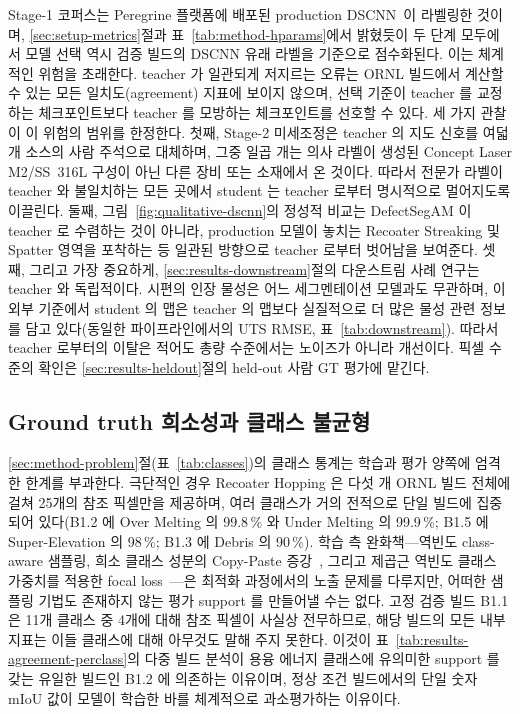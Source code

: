Stage-1 코퍼스는 Peregrine 플랫폼에 배포된 production
DSCNN~\cite{Scime2020DSCNN}이 라벨링한 것이며,
\ref{sec:setup-metrics}절과 표~\ref{tab:method-hparams}에서 밝혔듯이 두
단계 모두에서 모델 선택 역시 검증 빌드의 DSCNN 유래 라벨을 기준으로
점수화된다. 이는 체계적인
위험을 초래한다. teacher 가 일관되게 저지르는 오류는 ORNL 빌드에서 계산할
수 있는 모든 일치도(agreement) 지표에 보이지 않으며, 선택 기준이 teacher
를 교정하는 체크포인트보다 teacher 를 모방하는 체크포인트를 선호할 수
있다. 세 가지 관찰이 이 위험의 범위를 한정한다. 첫째, Stage-2 미세조정은
teacher 의 지도 신호를 여덟 개 소스의 사람 주석으로 대체하며, 그중 일곱
개는 의사 라벨이 생성된 Concept Laser M2/SS~316L 구성이 아닌 다른 장비
또는 소재에서 온 것이다. 따라서 전문가 라벨이 teacher 와 불일치하는 모든
곳에서 student 는 teacher 로부터 명시적으로 멀어지도록 이끌린다. 둘째,
그림~\ref{fig:qualitative-dscnn}의 정성적 비교는 DefectSegAM 이 teacher
로 수렴하는 것이 아니라, production 모델이 놓치는 Recoater Streaking 및
Spatter 영역을 포착하는 등 일관된 방향으로 teacher 로부터 벗어남을
보여준다. 셋째, 그리고 가장 중요하게,
\ref{sec:results-downstream}절의 다운스트림 사례 연구는 teacher 와
독립적이다. 시편의 인장 물성은 어느 세그멘테이션 모델과도 무관하며, 이
외부 기준에서 student 의 맵은 teacher 의 맵보다 실질적으로 더 많은 물성
관련 정보를 담고 있다(동일한 파이프라인에서의 UTS RMSE,
표~\ref{tab:downstream}). 따라서 teacher 로부터의 이탈은 적어도 총량
수준에서는 노이즈가 아니라 개선이다. 픽셀 수준의 확인은
\ref{sec:results-heldout}절의 held-out 사람 GT 평가에 맡긴다.

\subsection{Ground truth 희소성과 클래스 불균형}
\label{sec:discussion-imbalance}

\ref{sec:method-problem}절(표~\ref{tab:classes})의 클래스 통계는 학습과
평가 양쪽에 엄격한 한계를 부과한다. 극단적인 경우 Recoater Hopping 은
다섯 개 ORNL 빌드 전체에 걸쳐 25개의 참조 픽셀만을 제공하며, 여러
클래스가 거의 전적으로 단일 빌드에
집중되어 있다(B1.2 에 Over Melting 의 99.8\,\% 와 Under Melting 의
99.9\,\%; B1.5 에 Super-Elevation 의 98\,\%; B1.3 에 Debris 의 90\,\%).
학습 측 완화책---역빈도 class-aware 샘플링, 희소 클래스 성분의 Copy-Paste
증강~\cite{Ghiasi2021CopyPaste}, 그리고 제곱근 역빈도 클래스 가중치를
적용한 focal loss~\cite{Lin2017FocalLoss}---은 최적화 과정에서의 노출
문제를 다루지만, 어떠한 샘플링 기법도 존재하지 않는 평가 support 를
만들어낼 수는 없다. 고정 검증 빌드 B1.1 은 11개 클래스 중 4개에 대해 참조
픽셀이 사실상 전무하므로, 해당 빌드의 모든 내부 지표는 이들 클래스에 대해
아무것도 말해 주지 못한다. 이것이
표~\ref{tab:results-agreement-perclass}의 다중 빌드 분석이 용융 에너지
클래스에 유의미한 support 를 갖는 유일한 빌드인 B1.2 에 의존하는 이유이며,
정상 조건 빌드에서의 단일 숫자 mIoU 값이 모델이 학습한 바를 체계적으로
과소평가하는 이유이다.


